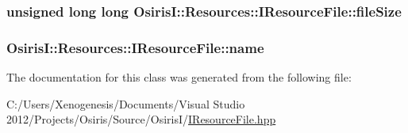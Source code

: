 \hypertarget{class_osiris_i_1_1_resources_1_1_i_resource_file_ae80e081a9cb48e35f4fa89f384263f96}{
\subsubsection[{file\-Size}]{\setlength{\rightskip}{0pt plus 5cm}unsigned long long Osiris\-I\-::\-Resources\-::\-I\-Resource\-File\-::file\-Size\hspace{0.3cm}{\ttfamily [protected]}}}\label{class_osiris_i_1_1_resources_1_1_i_resource_file_ae80e081a9cb48e35f4fa89f384263f96}
\hypertarget{class_osiris_i_1_1_resources_1_1_i_resource_file_ac08fab4403efba9b63648e65c7cc7408}{
\subsubsection[{name}]{ Osiris\-I\-::\-Resources\-::\-I\-Resource\-File\-::name\hspace{0.3cm}{\ttfamily [protected]}}}\label{class_osiris_i_1_1_resources_1_1_i_resource_file_ac08fab4403efba9b63648e65c7cc7408}


The documentation for this class was generated from the following file\-:\begin{DoxyCompactItemize}
\item 
C\-:/\-Users/\-Xenogenesis/\-Documents/\-Visual Studio 2012/\-Projects/\-Osiris/\-Source/\-Osiris\-I/\hyperlink{_i_resource_file_8hpp}{I\-Resource\-File.\-hpp}\end{DoxyCompactItemize}
